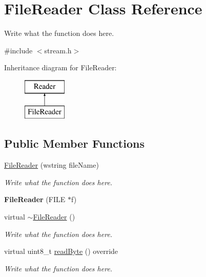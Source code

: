 \hypertarget{classFileReader}{\section{File\+Reader Class Reference}
\label{classFileReader}
}


Write what the function does here.  




{\ttfamily \#include $<$stream.\+h$>$}

Inheritance diagram for File\+Reader\+:\begin{figure}[H]
\begin{center}
\leavevmode
\includegraphics[height=2.000000cm]{classFileReader}
\end{center}
\end{figure}
\subsection*{Public Member Functions}
\begin{DoxyCompactItemize}
\item 
\hyperlink{classFileReader_a50ceae995b470d627f94caea10cd9956}{File\+Reader} (wstring file\+Name)
\begin{DoxyCompactList}\small\item\em Write what the function does here. \end{DoxyCompactList}\item 
\hypertarget{classFileReader_a3a06f152a16bd06550c3a4efeaed8ed2}{{\bfseries File\+Reader} (F\+I\+L\+E $\ast$f)}\label{classFileReader_a3a06f152a16bd06550c3a4efeaed8ed2}

\item 
virtual \hyperlink{classFileReader_a029d1ddebda388d1f0f5a99ce9acb311}{$\sim$\+File\+Reader} ()
\begin{DoxyCompactList}\small\item\em Write what the function does here. \end{DoxyCompactList}\item 
virtual uint8\+\_\+t \hyperlink{classFileReader_ac148435542dea9596532f2c3dd3c7668}{read\+Byte} () override
\begin{DoxyCompactList}\small\item\em Write what the function does here. \end{DoxyCompactList}\end{DoxyCompactItemize}
